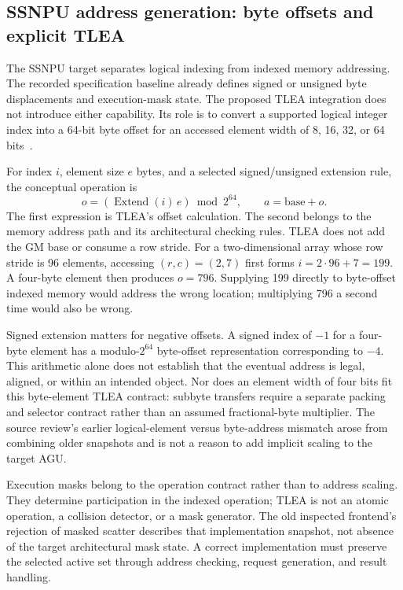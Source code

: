 \subsection{SSNPU address generation: byte offsets and explicit TLEA}

The SSNPU target separates logical indexing from indexed memory addressing. The recorded specification baseline already defines signed or unsigned byte displacements and execution-mask state. The proposed TLEA integration does not introduce either capability. Its role is to convert a supported logical integer index into a 64-bit byte offset for an accessed element width of 8, 16, 32, or 64 bits~\citep{u004_spec_address,u004_spec_masks,u004_spec_tlea}.

For index $i$, element size $e$ bytes, and a selected signed/unsigned extension rule, the conceptual operation is
\begin{equation}
 o=\left(\operatorname{Extend}(i)\,e\right)\bmod 2^{64},
 \qquad a=\mathrm{base}+o.
 \label{eq:u004_tlea}
\end{equation}
The first expression is TLEA's offset calculation. The second belongs to the memory address path and its architectural checking rules. TLEA does not add the GM base or consume a row stride. For a two-dimensional array whose row stride is 96 elements, accessing $(r,c)=(2,7)$ first forms $i=2\cdot96+7=199$. A four-byte element then produces $o=796$. Supplying 199 directly to byte-offset indexed memory would address the wrong location; multiplying 796 a second time would also be wrong.

Signed extension matters for negative offsets. A signed index of $-1$ for a four-byte element has a modulo-$2^{64}$ byte-offset representation corresponding to $-4$. This arithmetic alone does not establish that the eventual address is legal, aligned, or within an intended object. Nor does an element width of four bits fit this byte-element TLEA contract: subbyte transfers require a separate packing and selector contract rather than an assumed fractional-byte multiplier. The source review's earlier logical-element versus byte-address mismatch arose from combining older snapshots and is not a reason to add implicit scaling to the target AGU.

Execution masks belong to the operation contract rather than to address scaling. They determine participation in the indexed operation; TLEA is not an atomic operation, a collision detector, or a mask generator. The old inspected frontend's rejection of masked scatter describes that implementation snapshot, not absence of the target architectural mask state. A correct implementation must preserve the selected active set through address checking, request generation, and result handling.

